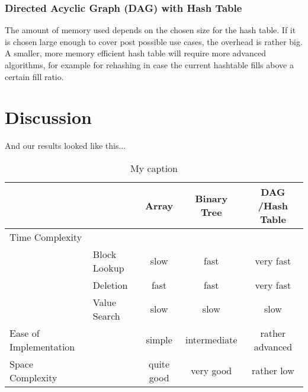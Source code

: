 \documentclass[a4paper,11pt,twoside]{article}
\begin{document}
\subsubsection{Directed Acyclic Graph (DAG) with Hash Table}
The amount of memory used depends on the chosen size for the hash
table. If it is chosen large enough to cover post possible use cases,
the overhead is rather big. A smaller, more memory efficient hash
table will require more advanced algorithms, for example for rehashing
in case the current hashtable fills above a certain fill ratio. 


\section{Discussion}
And our results looked like this...
\begin{table}[]
\centering
\caption{My caption}
\label{my-label}
\begin{tabular}{llccc}
                       &              & Array      & Binary Tree  &
                       DAG /Hash Table \\ \hline
Time Complexity        &              &            &              &
\\
                       & Block Lookup & slow       & fast         &
                       very fast       \\
                       & Deletion     & fast       & fast         &
                       very fast       \\
                       & Value Search & slow       & slow         &
                       slow            \\
Ease of Implementation &              & simple     & intermediate &
rather advanced \\
Space Complexity       &              & quite good & very good    &
rather low     
\end{tabular}
\end{table}


\end{document}
